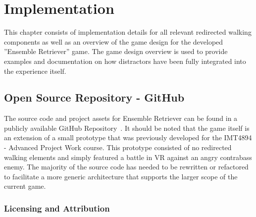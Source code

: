 \chapter{Implementation}
\label{chap:implementation}
This chapter consists of implementation details for all relevant redirected walking components as well as an overview of the game design for the developed ''Ensemble Retriever'' game. The game design overview is used to provide examples and documentation on how distractors have been fully integrated into the experience itself. 

\section{Open Source Repository - GitHub}
The source code and project assets for Ensemble Retriever can be found in a publicly available GitHub Repository~\cite{projectRepository}. It should be noted that the game itself is an extension of a small prototype that was previously developed for the IMT4894 - Advanced Project Work course. This prototype consisted of no redirected walking elements and simply featured a battle in VR against an angry contrabass enemy. The majority of the source code has needed to be rewritten or refactored to facilitate a more generic architecture that supports the larger scope of the current game.  

\subsection{Licensing and Attribution}


